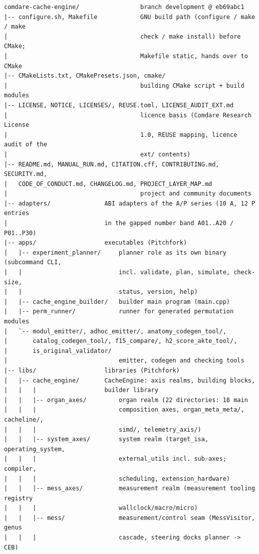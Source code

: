 {\footnotesize
\begin{verbatim}
comdare-cache-engine/                 branch development @ eb69abc1
|-- configure.sh, Makefile            GNU build path (configure / make / make
|                                     check / make install) before CMake;
|                                     Makefile static, hands over to CMake
|-- CMakeLists.txt, CMakePresets.json, cmake/
|                                     building CMake script + build modules
|-- LICENSE, NOTICE, LICENSES/, REUSE.toml, LICENSE_AUDIT_EXT.md
|                                     licence basis (Comdare Research License
|                                     1.0, REUSE mapping, licence audit of the
|                                     ext/ contents)
|-- README.md, MANUAL_RUN.md, CITATION.cff, CONTRIBUTING.md, SECURITY.md,
|   CODE_OF_CONDUCT.md, CHANGELOG.md, PROJECT_LAYER_MAP.md
|                                     project and community documents
|-- adapters/               ABI adapters of the A/P series (10 A, 12 P entries
|                           in the gapped number band A01..A20 / P01..P30)
|-- apps/                   executables (Pitchfork)
|   |-- experiment_planner/     planner role as its own binary (subcommand CLI,
|   |                           incl. validate, plan, simulate, check-size,
|   |                           status, version, help)
|   |-- cache_engine_builder/   builder main program (main.cpp)
|   |-- perm_runner/            runner for generated permutation modules
|   `-- modul_emitter/, adhoc_emitter/, anatomy_codegen_tool/,
|       catalog_codegen_tool/, f15_compare/, h2_score_akte_tool/,
|       is_original_validator/
|                               emitter, codegen and checking tools
|-- libs/                   libraries (Pitchfork)
|   |-- cache_engine/       CacheEngine: axis realms, building blocks,
|   |   |                   builder library
|   |   |-- organ_axes/         organ realm (22 directories: 18 main
|   |   |                       composition axes, organ_meta_meta/, cacheline/,
|   |   |                       simd/, telemetry_axis/)
|   |   |-- system_axes/        system realm (target_isa, operating_system,
|   |   |                       external_utils incl. sub-axes; compiler,
|   |   |                       scheduling, extension_hardware)
|   |   |-- mess_axes/          measurement realm (measurement tooling registry
|   |   |                       wallclock/macro/micro)
|   |   |-- mess/               measurement/control seam (MessVisitor, genus
|   |   |                       cascade, steering docks planner -> CEB)

\end{verbatim}}
